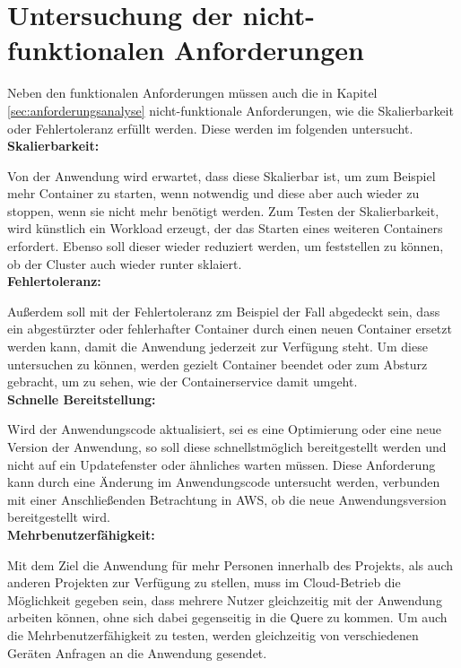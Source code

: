 \section{Untersuchung der nicht-funktionalen Anforderungen}
Neben den funktionalen Anforderungen müssen auch die in Kapitel \ref{sec:anforderungsanalyse} nicht-funktionale Anforderungen, wie die Skalierbarkeit oder Fehlertoleranz erfüllt werden. Diese werden im folgenden untersucht. \\

\textbf{Skalierbarkeit:}

Von der Anwendung wird erwartet, dass diese Skalierbar ist, um zum Beispiel mehr Container zu starten, wenn notwendig und diese aber auch wieder zu stoppen, wenn sie nicht mehr benötigt werden. Zum Testen der Skalierbarkeit, wird künstlich ein Workload erzeugt, der das Starten eines weiteren Containers erfordert. Ebenso soll dieser wieder reduziert werden, um feststellen zu können, ob der Cluster auch wieder runter sklaiert. \\

\textbf{Fehlertoleranz:}

Außerdem soll mit der Fehlertoleranz zm Beispiel der Fall abgedeckt sein, dass ein abgestürzter oder fehlerhafter Container durch einen neuen Container ersetzt werden kann, damit die Anwendung jederzeit zur Verfügung steht. Um diese untersuchen zu können, werden gezielt Container beendet oder zum Absturz gebracht, um zu sehen, wie der Containerservice damit umgeht. \\

\textbf{Schnelle Bereitstellung:}

Wird der Anwendungscode aktualisiert, sei es eine Optimierung oder eine neue Version der Anwendung, so soll diese schnellstmöglich bereitgestellt werden und nicht auf ein Updatefenster oder ähnliches warten müssen. Diese Anforderung kann durch eine Änderung im Anwendungscode untersucht werden, verbunden mit einer Anschließenden Betrachtung in \ac{AWS}, ob die neue Anwendungsversion bereitgestellt wird. \\

\textbf{Mehrbenutzerfähigkeit:}

Mit dem Ziel die Anwendung für mehr Personen innerhalb des Projekts, als auch anderen Projekten zur Verfügung zu stellen, muss im Cloud-Betrieb die Möglichkeit gegeben sein, dass mehrere Nutzer gleichzeitig mit der Anwendung arbeiten können, ohne sich dabei gegenseitig in die Quere zu kommen. Um auch die Mehrbenutzerfähigkeit zu testen, werden gleichzeitig von verschiedenen Geräten Anfragen an die Anwendung gesendet. \pagebreak

